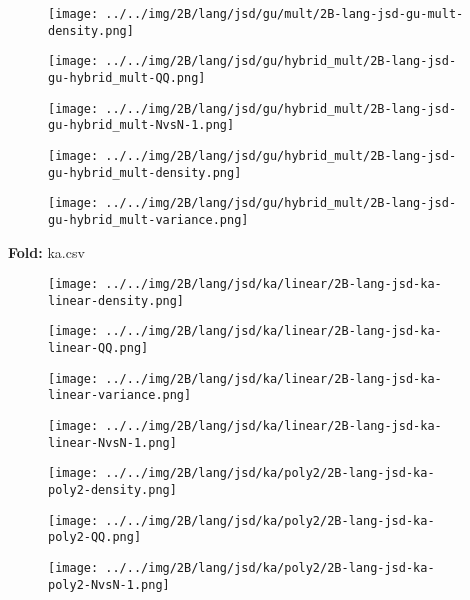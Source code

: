 \begin{figure}[H]
\centering	\texttt{[image: ../../img/2B/lang/jsd/gu/mult/2B-lang-jsd-gu-mult-density.png]}
\end{figure}
\begin{figure}[H]
\centering	\texttt{[image: ../../img/2B/lang/jsd/gu/hybrid\_mult/2B-lang-jsd-gu-hybrid\_mult-QQ.png]}
\end{figure}
\begin{figure}[H]
\centering	\texttt{[image: ../../img/2B/lang/jsd/gu/hybrid\_mult/2B-lang-jsd-gu-hybrid\_mult-NvsN-1.png]}
\end{figure}
\begin{figure}[H]
\centering	\texttt{[image: ../../img/2B/lang/jsd/gu/hybrid\_mult/2B-lang-jsd-gu-hybrid\_mult-density.png]}
\end{figure}
\begin{figure}[H]
\centering	\texttt{[image: ../../img/2B/lang/jsd/gu/hybrid\_mult/2B-lang-jsd-gu-hybrid\_mult-variance.png]}
\end{figure}
\textbf{Fold:} ka.csv
\begin{figure}[H]
\centering	\texttt{[image: ../../img/2B/lang/jsd/ka/linear/2B-lang-jsd-ka-linear-density.png]}
\end{figure}
\begin{figure}[H]
\centering	\texttt{[image: ../../img/2B/lang/jsd/ka/linear/2B-lang-jsd-ka-linear-QQ.png]}
\end{figure}
\begin{figure}[H]
\centering	\texttt{[image: ../../img/2B/lang/jsd/ka/linear/2B-lang-jsd-ka-linear-variance.png]}
\end{figure}
\begin{figure}[H]
\centering	\texttt{[image: ../../img/2B/lang/jsd/ka/linear/2B-lang-jsd-ka-linear-NvsN-1.png]}
\end{figure}
\begin{figure}[H]
\centering	\texttt{[image: ../../img/2B/lang/jsd/ka/poly2/2B-lang-jsd-ka-poly2-density.png]}
\end{figure}
\begin{figure}[H]
\centering	\texttt{[image: ../../img/2B/lang/jsd/ka/poly2/2B-lang-jsd-ka-poly2-QQ.png]}
\end{figure}
\begin{figure}[H]
\centering	\texttt{[image: ../../img/2B/lang/jsd/ka/poly2/2B-lang-jsd-ka-poly2-NvsN-1.png]}
\end{figure}
